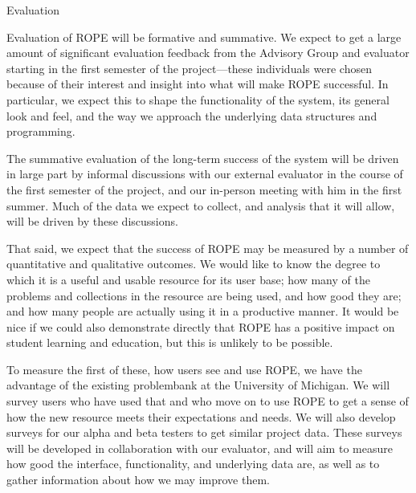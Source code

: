 \documentclass[11pt]{article}
\begin{document}
\begin{section}{Evaluation}

Evaluation of ROPE will be formative and summative.  We expect to get a
large amount of significant evaluation feedback from the Advisory
Group and evaluator starting in the first semester of the
project---these individuals were chosen because of their interest and
insight into what will make ROPE successful.  In particular, we expect
this to shape the functionality of the system, its general look and feel,
and the way we approach the underlying data structures and programming.  

The summative evaluation of the long-term success of the system will be
driven in large part by informal discussions with our external evaluator
in the course of the first semester of the project, and our in-person
meeting with him in the first summer.  Much of the data we expect to
collect, and analysis that it will allow, will be driven by these
discussions.  


That said, we expect that the success of ROPE may be measured by a number
of quantitative and qualitative outcomes.  We would like to know the
degree to which it is 
a useful and usable resource for its user base; how many of the problems
and collections in the resource are being used, and how good they are; and
how many people are actually using it in a productive manner.  It would be
nice if we could also demonstrate directly that ROPE has a positive impact
on student learning and education, but this is unlikely to be possible.

To measure the first of these, how users see and use ROPE, we have the
advantage of the existing problembank at the University of Michigan.  We
will survey users who have used that and who move on to use ROPE to get a
sense of how the new resource meets their expectations and needs.  We will
also develop surveys for our alpha and beta testers to get similar project
data.  These surveys will be developed in collaboration with our
evaluator, and will aim to measure how good the interface, functionality,
and underlying data are, as well as to gather information about how we may
improve them.


\end{section}
\end{document}
